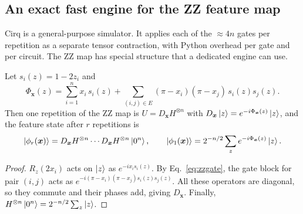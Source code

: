 \subsection{An exact fast engine for the ZZ feature map}
Cirq is a general-purpose simulator. It applies each of the $\approx\!4n$ gates per repetition as
a separate tensor contraction, with Python overhead per gate and per circuit. The ZZ map has
special structure that a dedicated engine can use.

\begin{proposition}
Let $s_i(z)=1-2z_i$ and
\begin{equation}
\Phi_{\bm x}(z)=\sum_{i=1}^n x_i\,s_i(z)+\sum_{(i,j)\in E}(\pi-x_i)(\pi-x_j)\,s_i(z)s_j(z).
\label{eq:phase}
\end{equation}
Then one repetition of the ZZ map is $U=D_{\bm x}H^{\otimes n}$ with $D_{\bm x}\left|z\right\rangle=e^{-i\Phi_{\bm x}(z)}\left|z\right\rangle$,
and the feature state after $r$ repetitions is
\begin{equation}
\left|\phi_r(\bm x)\right\rangle=D_{\bm x}H^{\otimes n}\cdots D_{\bm x}H^{\otimes n}\left|0^n\right\rangle,\qquad
\left|\phi_1(\bm x)\right\rangle=2^{-n/2}\sum_z e^{-i\Phi_{\bm x}(z)}\left|z\right\rangle .
\end{equation}
\end{proposition}
\begin{proof}
$R_z(2x_i)$ acts on $\left|z\right\rangle$ as $e^{-ix_is_i(z)}$. By Eq.~\eqref{eq:zzgate}, the gate block for
pair $(i,j)$ acts as $e^{-i(\pi-x_i)(\pi-x_j)s_i(z)s_j(z)}$. All these operators are diagonal, so
they commute and their phases add, giving $D_{\bm x}$. Finally,
$H^{\otimes n}\left|0^n\right\rangle=2^{-n/2}\sum_z\left|z\right\rangle$.
\end{proof}

